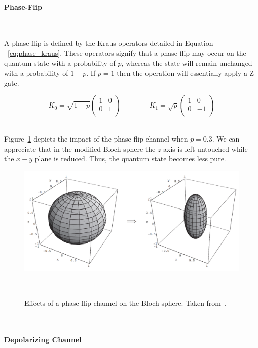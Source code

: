 \paragraph{Phase-Flip} \

A phase-flip is defined by the Kraus operators detailed in Equation
~\ref{eq:phase_kraus}. These operators signify that a phase-flip
may occur on the quantum state with a probability of \(p\), whereas
the state will remain unchanged with a probability of \(1-p\). If
\(p=1\) then the operation will essentially apply a Z gate. \

\begin{equation}\label{eq:phase_kraus}
  K_0 = \sqrt{1-p} \begin{pmatrix}
          1 & 0 \\
          0 & 1 \\
        \end{pmatrix} \qquad \qquad
  K_1 = \sqrt{p} \begin{pmatrix}
          1 & 0 \\
          0 & -1 \\
        \end{pmatrix}
\end{equation} \

Figure~\ref{fig:phase_flip} depicts the impact of the phase-flip
channel when \(p=0.3\). We can appreciate that in the modified
Bloch sphere the \(z\)-axis is left untouched while the \(x-y\)
plane is reduced. Thus, the quantum state becomes less pure. \

\begin{figure}[h!]
  \includegraphics[scale=0.39]{figures/phase_flip.png}
  \centering
  \caption{Effects of a phase-flip channel on the Bloch sphere. Taken from~\cite{nielsen_quantum_2010}.}
~\label{fig:phase_flip}
\end{figure} \

\paragraph{Depolarizing Channel} \

